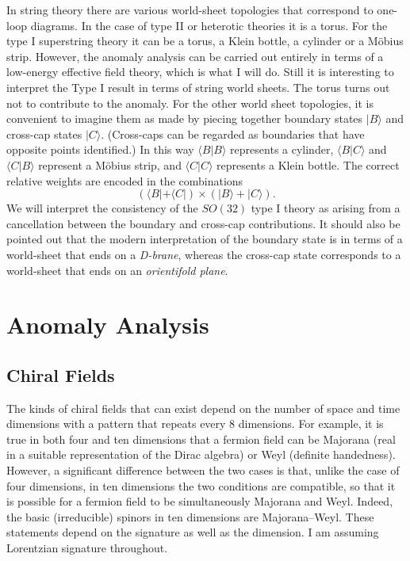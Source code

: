 \documentclass[a4paper,12pt]{article}
\begin{document}
In string theory there are various world-sheet topologies that
correspond to one-loop diagrams. In the case of  type II or
heterotic theories it is a torus. For the type I superstring
theory it can be a torus, a Klein bottle, a cylinder or a M\"obius
strip. However, the anomaly analysis can be carried out entirely
in terms of a low-energy effective field theory, which is what I
will do. Still it is interesting to interpret the Type I result in
terms of string world sheets. The torus turns out not to
contribute to the anomaly. For the other world sheet topologies,
it is convenient to imagine them as made by piecing together
boundary states $|B\rangle$ and cross-cap states $|C\rangle$. (Cross-caps can
be regarded as boundaries that have opposite points identified.)
In this way $\langle B|B\rangle$ represents a cylinder, 
$\langle B|C\rangle$ and $\langle C|B \rangle$
represent a M\"obius strip, and $\langle C|C\rangle$ represents a Klein
bottle. The correct relative weights are encoded in the
combinations
\begin{equation}
(\langle B| + \langle C|) \times (|B\rangle  + |C\rangle).
\end{equation}
We will interpret the consistency of the $SO(32)$ type I theory as
arising from a cancellation between the boundary and cross-cap
contributions. It should also be pointed out that the modern
interpretation of the boundary state is in terms of a world-sheet
that ends on a {\it D-brane}, whereas the cross-cap state
corresponds to a world-sheet that ends on an {\it orientifold
plane}.

\section{Anomaly Analysis}
\subsection{Chiral Fields}
The kinds of chiral fields that can exist depend on the number of
space and time dimensions with a pattern that repeats every 8
dimensions. For example, it is true in both four and ten
dimensions that a fermion field can be Majorana (real in a
suitable representation of the Dirac algebra) or Weyl (definite
handedness). However, a significant difference between the two
cases is that, unlike the case of four dimensions,
in ten dimensions the two conditions are compatible,
so that it is possible for a fermion field to be simultaneously
Majorana and Weyl. Indeed, the basic (irreducible) spinors in ten
dimensions are Majorana--Weyl. These statements depend on the
signature as well as the dimension. I am assuming Lorentzian
signature throughout.
\end{document}
